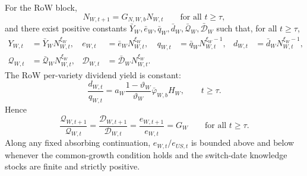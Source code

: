 \documentclass{article}
\begin{document}
\begin{prop}
For the RoW block,
\begin{equation}\label{bg_w_knowledge_growth}
N_{W,t+1}=G_{N,W,b}N_{W,t}
\qquad\text{for all }t\ge\tau,
\end{equation}
and there exist positive constants
$\bar Y_W,\bar e_W,\bar q_W,\bar d_W,\bar{\mathcal Q}_W,\bar{\mathcal D}_W$
such that, for all $t\ge\tau$,
\begin{align}
Y_{W,t}&=\bar Y_W N_{W,t}^{\xi_W},
&
e_{W,t}&=\bar e_W N_{W,t}^{\xi_W},
&
q_{W,t}&=\bar q_W N_{W,t}^{\xi_W-1},
&
d_{W,t}&=\bar d_W N_{W,t}^{\xi_W-1},
\label{bg_w_per_variety_scaling}\\
\mathcal Q_{W,t}&=\bar{\mathcal Q}_W N_{W,t}^{\xi_W},
&
\mathcal D_{W,t}&=\bar{\mathcal D}_W N_{W,t}^{\xi_W}.
\label{bg_w_scaling}
\end{align}
The RoW per-variety dividend yield is constant:
\begin{equation}\label{bg_w_dividend_yield}
\frac{d_{W,t}}{q_{W,t}}
=
a_W\frac{1-\vartheta_W}{\vartheta_W}\bar\varphi_{W,b}H_W,
\qquad t\ge\tau.
\end{equation}
Hence
\begin{equation}\label{bg_w_growth_rate}
\frac{\mathcal Q_{W,t+1}}{\mathcal Q_{W,t}}
=
\frac{\mathcal D_{W,t+1}}{\mathcal D_{W,t}}
=
\frac{e_{W,t+1}}{e_{W,t}}
=
G_W
\qquad\text{for all }t\ge\tau.
\end{equation}
Along any fixed absorbing continuation, $e_{W,t}/e_{US,t}$ is bounded above and below whenever the common-growth condition holds and the switch-date knowledge stocks are finite and strictly positive.
\end{prop}
\end{document}
